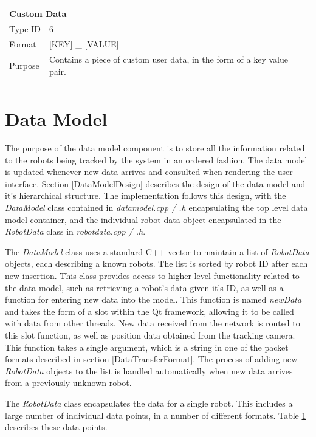 \begin{longtable}{ l p{12cm} }
 \hline
 \multicolumn{2}{p{12cm}}{\textbf{Custom Data}}\\
 \hline
 Type ID & 6 \\
 Format & [KEY] \_ [VALUE]\\
 Purpose & Contains a piece of custom user data, in the form of a key value pair. \\
	
 \label{tab:DataFormat}
\end{longtable}


\section{Data Model}
The purpose of the data model component is to store all the information related to the robots being tracked by the system in an ordered fashion. The data model is updated whenever new data arrives and consulted when rendering the user interface. Section \ref{DataModelDesign} describes the design of the data model and it's hierarchical structure. The implementation follows this design, with the \textit{DataModel} class contained in \textit{datamodel.cpp / .h} encapsulating the top level data model container, and the individual robot data object encapsulated in the \textit{RobotData} class in \textit{robotdata.cpp / .h}. 

The \textit{DataModel} class uses a standard C++ vector to maintain a list of \textit{RobotData} objects, each describing a known robots. The list is sorted by robot ID after each new insertion. This class provides access to higher level functionality related to the data model, such as retrieving a robot's data given it's ID, as well as a function for entering new data into the model. This function is named \textit{newData} and takes the form of a slot within the Qt framework, allowing it to be called with data from other threads. New data received from the network is routed to this slot function, as well as position data obtained from the tracking camera. This function takes a single argument, which is a string in one of the packet formats described in section \ref{DataTransferFormat}. The process of adding new \textit{RobotData} objects to the list is handled automatically when new data arrives from a previously unknown robot.

The \textit{RobotData} class encapsulates the data for a single robot. This includes a large number of individual data points, in a number of different formats. Table \ref{} describes these data points.

